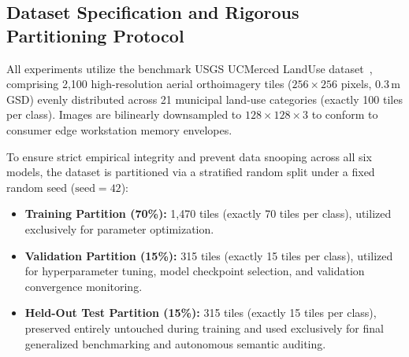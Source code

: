 \documentclass[journal]{IEEEtran}
\begin{document}
\subsection{Dataset Specification and Rigorous Partitioning Protocol}
All experiments utilize the benchmark USGS UCMerced LandUse dataset~\cite{yang2010bag}, comprising 2,100 high-resolution aerial orthoimagery tiles ($256 \times 256$ pixels, 0.3\,m GSD) evenly distributed across 21 municipal land-use categories (exactly 100 tiles per class). Images are bilinearly downsampled to $128 \times 128 \times 3$ to conform to consumer edge workstation memory envelopes.

To ensure strict empirical integrity and prevent data snooping across all six models, the dataset is partitioned via a stratified random split under a fixed random seed ($\text{seed} = 42$):
\begin{itemize}
    \item \textbf{Training Partition (70\%):} 1,470 tiles (exactly 70 tiles per class), utilized exclusively for parameter optimization.
    \item \textbf{Validation Partition (15\%):} 315 tiles (exactly 15 tiles per class), utilized for hyperparameter tuning, model checkpoint selection, and validation convergence monitoring.
    \item \textbf{Held-Out Test Partition (15\%):} 315 tiles (exactly 15 tiles per class), preserved entirely untouched during training and used exclusively for final generalized benchmarking and autonomous semantic auditing.
\end{itemize}
\end{document}
